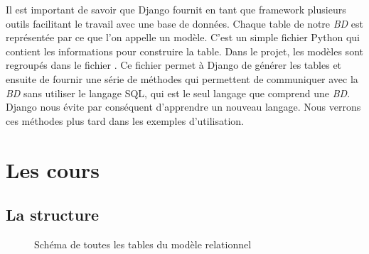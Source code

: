 \documentclass[letterpaper,10pt,oneside]{sphinxmanual}
\begin{document}
Il est important de savoir que Django fournit en tant que framework plusieurs outils facilitant le travail avec une base de données. Chaque table de notre \emph{BD} est représentée par ce que l'on appelle un modèle. C'est un simple fichier Python qui contient les informations pour construire la table. Dans le projet, les modèles sont regroupés dans le fichier . Ce fichier permet à Django de générer les tables et ensuite de fournir une série de méthodes qui permettent de communiquer avec la \emph{BD} sans utiliser le langage SQL, qui est le seul langage que comprend une \emph{BD}. Django nous évite par conséquent d'apprendre un nouveau langage. Nous verrons ces méthodes plus tard dans les exemples d'utilisation.


\section{Les cours}
\label{models:les-cours}

\subsection{La structure}
\label{models:la-structure}\begin{figure}[htbp]
\centering
\capstart

\caption{Schéma de toutes les tables du modèle relationnel}\end{figure}
\end{document}
